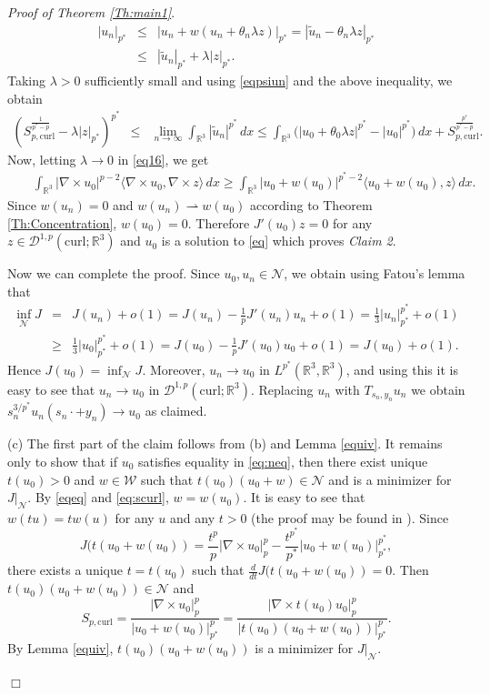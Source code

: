 \documentclass[12pt,leqno,twoside]{amsart}
\newenvironment{altproof}[1]
{\noindent%
{\em Proof of {#1}}.}
{\nopagebreak\mbox{}\hfill $\Box$\par\addvspace{0.5cm}}
\newcommand{\wt}{\widetilde}
\def\R{\mathbb{R}}
\def\curl{\mathrm{curl}}
\def\Wc{\mathscr{W}}
\def\rh{\rightharpoonup}
\newcommand{\cD}{{\mathcal D}}
\newcommand{\cN}{{\mathcal N}}
\newcommand{\cW}{{\mathcal W}}
\def\r{\mathbb{R}}
\def\r3{\mathbb{R}^3}
\def\Wc{\cD^{1,p}(\curl;\R^3)}
\def\rh{\rightharpoonup}
\def\wt{\widetilde}
\def\curlop{\nabla\times}
\numberwithin{equation}{section}
\begin{document}
\begin{altproof}{Theorem \ref{Th:main1}}
\begin{eqnarray*}
	|u_n|_{p^*}
	&\le& |u_n+w(u_n+\theta_n\lambda z)|_{p^*}
	= |\wt u_n-\theta_n\lambda z|_{p^*}\\
	&\le& |\wt u_n|_{p^*}+\lambda|z|_{p^*}.
\end{eqnarray*}
Taking $\lambda>0$ sufficiently small and using
\eqref{eqpsiun} and the above inequality, we obtain
\begin{eqnarray*}
	\left(
	S_{p,\curl}^{\frac{1}{p^*-p}}-\lambda|z|_{p^*}
	\right)^{p^*}
	&\leq& \lim_{n\to\infty}\int_{\R^3}|\wt u_n|^{p^*}\,dx\leq
	\int_{\R^3}
	\big(|u_0+\theta_0\lambda z|^{p^*}-|u_0|^{p^*}\big)\,dx
	+S_{p,\curl}^{\frac{p^*}{p^*-p}}.
\end{eqnarray*}
Now, letting $\lambda\to 0$ in \eqref{eq16}, we get
\begin{eqnarray*}
	&&\int_{\R^3}|\curlop u_0|^{p-2}\langle \curlop u_0,\curlop  z\rangle\,dx
	\geq \int_{\R^3}|u_0+w(u_0)|^{p^*-2}\langle u_0+w(u_0),z\rangle \,dx.
\end{eqnarray*} 
Since $w(u_n)=0$ and $w(u_n)\rh w(u_0)$ according to Theorem \ref{Th:Concentration}, $w(u_0)=0$. Therefore $J'(u_0)z=0$ for any $z\in\Wc$ and $u_0$ is a solution to \eqref{eq} which proves \emph{Claim 2}.

\medskip

Now we can complete the proof. Since $u_0, u_n\in\cN$, 
we obtain using Fatou's lemma that
\begin{eqnarray*}
	\inf_\cN J & = &  J(u_n)+o(1) = J(u_n)-\frac1p J'(u_n)u_n + o(1) = \frac13|u_n|^{p^*}_{p^*} + o(1) \\
	& \ge & \frac13|u_0|^{p^*}_{p^*} + o(1) = J(u_0)-\frac1pJ'(u_0)u_0+o(1)=J(u_0) + o(1).
\end{eqnarray*}
Hence $J(u_0)=\inf_\cN J$. Moreover, $u_n\to u_0$ in $L^{p^*}(\r3,\r3)$, and using this it is easy to see that $u_n\to u_0$ in $\Wc$. Replacing $u_n$ with $T_{s_n,y_n}u_n$ we obtain $s_n^{3/p^*}u_n(s_n\cdot +y_n) \to u_0$ as claimed.

\medskip


(c) The first part of the claim follows from (b) and Lemma \ref{equiv}. It remains only to show that if $u_0$ satisfies equality in  \eqref{eq:neq}, then there exist unique $t(u_0)>0$ and $w\in\cW$ such that $t(u_0)(u_0+w)\in\cN$ and is a minimizer for $J|_\cN$. By \eqref{eqeq} and \eqref{eq:scurl}, $w=w(u_0)$. It is easy to see that $w(tu)=tw(u)$ for any $u$ and any $t> 0$ (the proof may be found in \cite[Lemma 4.2]{MedSz}). Since 
$$
J(t(u_0+w(u_0)) = \frac{t^p}p|\curlop u_0|_p^p -\frac{t^{p^*}}{p^*}|u_0+w(u_0)|^{p^*}_{p^*},
$$ 
there exists a unique $t=t(u_0)$ such that $\frac d{dt}J(t(u_0+w(u_0))=0$. Then $t(u_0)(u_0+w(u_0))\in\cN$ and
\[
S_{p,\curl} = \frac{|\nabla\times u_0|_p^p}{|u_0+w(u_0)|_{p^*}^p} = \frac{|\nabla\times t(u_0)u_0|_p^p}{|t(u_0)(u_0+w(u_0))|_{p^*}^p}.
\] 
By Lemma \ref{equiv}, $t(u_0)(u_0+w(u_0))$ is a minimizer for $J|_\cN$.



\end{altproof}
\end{document}
